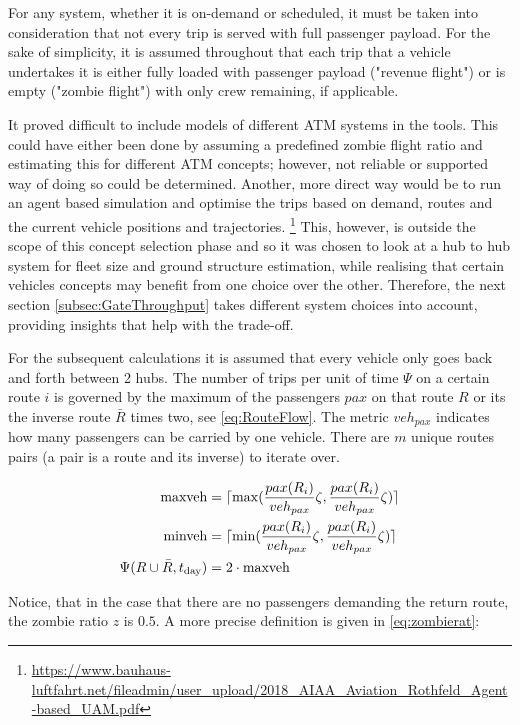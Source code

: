 For any system, whether it is on-demand or scheduled, it must be taken into consideration that not every trip is served with full passenger payload. For the sake of simplicity, it is assumed throughout that each trip that a vehicle undertakes it is either fully loaded with passenger payload ("revenue flight") or is empty ("zombie flight") with only crew remaining, if applicable.

It proved difficult to include models of different ATM systems in the tools. This could have either been done by assuming a predefined zombie flight ratio and estimating this for different ATM concepts; however, not reliable or supported way of doing so could be determined. Another, more direct way would be to run an agent based simulation and optimise the trips based on demand, routes and the current vehicle positions and trajectories. \footnote{\url{https://www.bauhaus-luftfahrt.net/fileadmin/user_upload/2018_AIAA_Aviation_Rothfeld_Agent-based_UAM.pdf}} This, however, is outside the scope of this concept selection phase and so it was chosen to look at a hub to hub system for fleet size and ground structure estimation, while realising that certain vehicles concepts may benefit from one choice over the other. Therefore, the next section \ref{subsec:GateThroughput} takes different system choices into account, providing insights that help with the trade-off.

For the subsequent calculations it is assumed that every vehicle only goes back and forth between 2 hubs. The number of trips per unit of time $\Psi$ on a certain route $i$ is governed by the maximum of the passengers $pax$ on that route $R$ or its the inverse route $\bar{R}$ times two, see \autoref{eq:RouteFlow}. The metric $veh_{pax}$ indicates how many passengers can be carried by one vehicle. There are $m$ unique routes pairs (a pair is a route and its inverse) to iterate over.

\begin{align} \label{eq:RouteFlow}
    \text{maxveh} &= \lceil \max( \frac{pax(R_i)}{veh_{pax}} \zeta, \frac{pax(R_i)}{veh_{pax}}\zeta ) \rceil\\
    \text{minveh} &= \lceil \min( \frac{pax(R_i)}{veh_{pax}} \zeta, \frac{pax(R_i)}{veh_{pax}}\zeta ) \rceil\\
    \Psi(R\cup\bar{R}, t_{\text{day}}) &= 2\cdot \text{maxveh}
\end{align}

Notice, that in the case that there are no passengers demanding the return route, the zombie ratio $z$ is $0.5$. A more precise definition is given in \autoref{eq:zombierat}:


